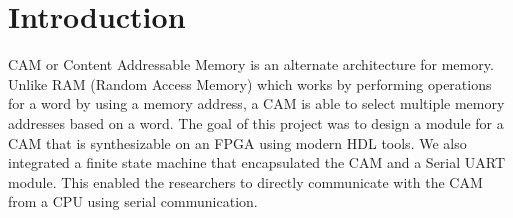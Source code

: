 \section{Introduction}
CAM or Content Addressable Memory is an alternate architecture for memory. Unlike RAM (Random Access Memory) which works by performing operations for a word by using a memory address, a CAM is able to select multiple memory addresses based on a word.  
The goal of this project was to design a module for a CAM that is synthesizable on an FPGA using modern HDL tools. 
We also integrated a finite state machine that encapsulated the CAM and a Serial UART module. 
This enabled the researchers to directly communicate with the CAM from a CPU using serial communication. 
